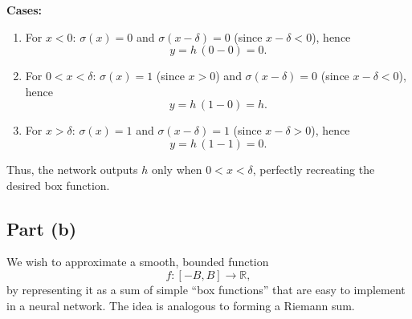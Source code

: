 \documentclass{article}
\begin{document}
\begin{center}
\end{center}

\textbf{Cases:}
\begin{enumerate}
    \item For \( x < 0 \):  
          \(\sigma(x) = 0\) and \(\sigma(x-\delta) = 0\) (since \(x-\delta < 0\)), hence
          \[
          y = h\,(0 - 0) = 0.
          \]
    \item For \( 0 < x < \delta \):  
          \(\sigma(x) = 1\) (since \(x > 0\)) and \(\sigma(x-\delta) = 0\) (since \(x-\delta < 0\)), hence
          \[
          y = h\,(1 - 0) = h.
          \]
    \item For \( x > \delta \):  
          \(\sigma(x) = 1\) and \(\sigma(x-\delta) = 1\) (since \(x-\delta > 0\)), hence
          \[
          y = h\,(1 - 1) = 0.
          \]
\end{enumerate}
Thus, the network outputs \( h \) only when \( 0 < x < \delta \), perfectly recreating the desired box function.

\subsection*{Part (b)}
We wish to approximate a smooth, bounded function 
\[
f: [-B,B] \to \mathbb{R},
\]
by representing it as a sum of simple “box functions” that are easy to implement in a neural network. The idea is analogous to forming a Riemann sum.
\end{document}
